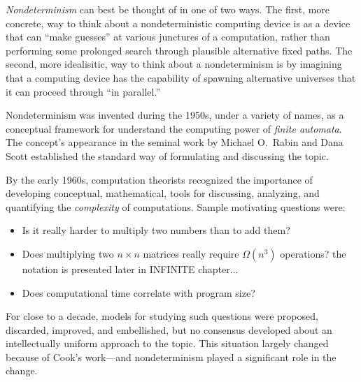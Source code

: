 \medskip

{\it Nondeterminism} can best be thought of in one of two ways.  The
first, more concrete, way to think about a nondeterministic computing
device is as a device that can ``make guesses'' at various junctures
of a computation, rather than performing some prolonged search through
plausible alternative fixed paths.  The second, more idealisitic, way
to think about a nondeterminism is by imagining that a computing
device has the capability of spawning alternative universes that it
can proceed through ``in parallel.''

\bigskip

\noindent {}
\bigskip

\noindent 
Nondeterminism was invented during the 1950s, under a variety of
names, as a conceptual framework for understand the computing power of
{\it finite automata}.   The concept's
appearance in the seminal work \cite{RabinS59} by Michael O.~Rabin
 and Dana Scott 
established the standard way of formulating and discussing the topic.

\medskip

By the early 1960s, computation theorists recognized the importance of
developing conceptual, mathematical, tools for discussing, analyzing,
and quantifying the {\it complexity} of computations.  Sample
motivating questions were:
\begin{itemize}
\item
Is it really harder to multiply two numbers than to add them?
\item
Does multiplying two $n \times n$ matrices really require
$\Omega(n^3)$ operations?
{\Denis the notation is presented later in INFINITE chapter...}
\item
Does computational time correlate with program size?
\end{itemize}
For close to a decade, models for studying such questions were
proposed, discarded, improved, and embellished, but no consensus
developed about an intellectually uniform approach to the topic.  This
situation largely changed because of Cook's work---and nondeterminism
played a significant role in the change.

